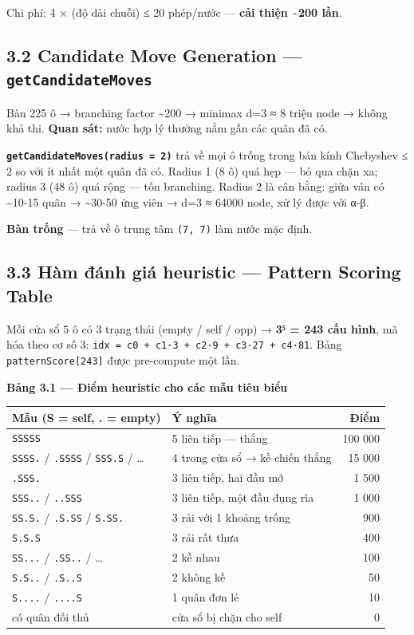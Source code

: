 \documentclass[11pt,a4paper]{article}
\begin{document}
Chi phí: 4 × (độ dài chuỗi) ≤ 20 phép/nước — \textbf{cải thiện \textasciitilde{}200 lần}.
\subsection{3.2 Candidate Move Generation — \texttt{getCandidateMoves}}
\label{sec:org092dcfd}

Bàn 225 ô → branching factor \textasciitilde{}200 → minimax d=3 ≈ 8 triệu node → không khả thi. \textbf{Quan sát:} nước hợp lý thường nằm gần các quân đã có.

\textbf{\texttt{getCandidateMoves(radius = 2)}} trả về mọi ô trống trong bán kính Chebyshev ≤ 2 so với ít nhất một quân đã có. Radius 1 (8 ô) quá hẹp — bỏ qua chặn xa; radius 3 (48 ô) quá rộng — tốn branching. Radius 2 là cân bằng: giữa ván có \textasciitilde{}10-15 quân → \textasciitilde{}30-50 ứng viên → d=3 ≈ 64000 node, xử lý được với α-β.

\textbf{Bàn trống} — trả về ô trung tâm \texttt{(7, 7)} làm nước mặc định.
\subsection{3.3 Hàm đánh giá heuristic — Pattern Scoring Table}
\label{sec:org6d48776}

Mỗi cửa sổ 5 ô có 3 trạng thái (empty / self / opp) → \textbf{3⁵ = 243 cấu hình}, mã hóa theo cơ số 3: \texttt{idx = c0 + c1·3 + c2·9 + c3·27 + c4·81}. Bảng \texttt{patternScore[243]} được pre-compute một lần.

\textbf{Bảng 3.1 — Điểm heuristic cho các mẫu tiêu biểu}

\begin{center}
\begin{tabular}{llr}
Mẫu (S = self, . = empty) & Ý nghĩa & Điểm\\
\hline
\texttt{SSSSS} & 5 liên tiếp — thắng & 100 000\\
\texttt{SSSS.} / \texttt{.SSSS} / \texttt{SSS.S} / … & 4 trong cửa sổ → kề chiến thắng & 15 000\\
\texttt{.SSS.} & 3 liên tiếp, hai đầu mở & 1 500\\
\texttt{SSS..} / \texttt{..SSS} & 3 liên tiếp, một đầu đụng rìa & 1 000\\
\texttt{SS.S.} / \texttt{.S.SS} / \texttt{S.SS.} & 3 rải với 1 khoảng trống & 900\\
\texttt{S.S.S} & 3 rải rất thưa & 400\\
\texttt{SS...} / \texttt{.SS..} / … & 2 kề nhau & 100\\
\texttt{S.S..} / \texttt{.S..S} & 2 không kề & 50\\
\texttt{S....} / \texttt{....S} & 1 quân đơn lẻ & 10\\
có quân đối thủ & cửa sổ bị chặn cho self & 0\\
\end{tabular}
\end{center}
\end{document}
